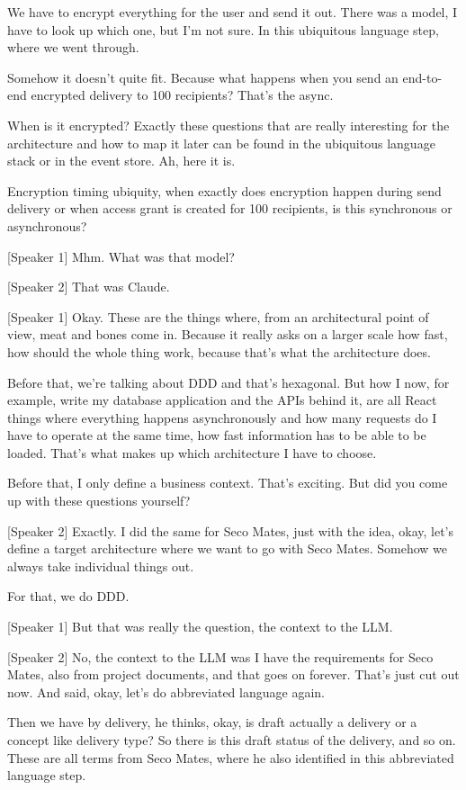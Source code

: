 We have to encrypt everything for the user and send it out. There was a model, I have to look up which one, but I'm not sure. In this ubiquitous language step, where we went through.

Somehow it doesn't quite fit. Because what happens when you send an end-to-end encrypted delivery to 100 recipients? That's the async.

When is it encrypted? Exactly these questions that are really interesting for the architecture and how to map it later can be found in the ubiquitous language stack or in the event store. Ah, here it is.

Encryption timing ubiquity, when exactly does encryption happen during send delivery or when access grant is created for 100 recipients, is this synchronous or asynchronous?

[Speaker 1]
Mhm. What was that model?

[Speaker 2]
That was Claude.

[Speaker 1]
Okay. These are the things where, from an architectural point of view, meat and bones come in. Because it really asks on a larger scale how fast, how should the whole thing work, because that's what the architecture does.

Before that, we're talking about DDD and that's hexagonal. But how I now, for example, write my database application and the APIs behind it, are all React things where everything happens asynchronously and how many requests do I have to operate at the same time, how fast information has to be able to be loaded. That's what makes up which architecture I have to choose.

Before that, I only define a business context. That's exciting. But did you come up with these questions yourself?

[Speaker 2]
Exactly. I did the same for Seco Mates, just with the idea, okay, let's define a target architecture where we want to go with Seco Mates. Somehow we always take individual things out.

For that, we do DDD.

[Speaker 1]
But that was really the question, the context to the LLM.

[Speaker 2]
No, the context to the LLM was I have the requirements for Seco Mates, also from project documents, and that goes on forever. That's just cut out now. And said, okay, let's do abbreviated language again.

Then we have by delivery, he thinks, okay, is draft actually a delivery or a concept like delivery type? So there is this draft status of the delivery, and so on. These are all terms from Seco Mates, where he also identified in this abbreviated language step.


